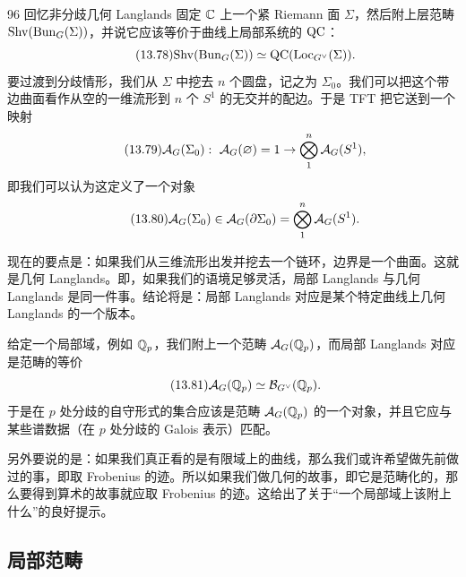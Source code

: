 \begin{srcrem}{96}
回忆非分歧几何 Langlands 固定 $\mathbb{C}$ 上一个紧 Riemann 面 $\Sigma$，然后附上层范畴 $\mathrm{Shv}(\mathrm{Bun}_G(\Sigma))$，并说它应该等价于曲线上局部系统的 $\mathrm{QC}$：
\begin{equation}\tag{13.78}
\mathrm{Shv}(\mathrm{Bun}_G(\Sigma))\simeq\mathrm{QC}(\mathrm{Loc}_{G^\vee}(\Sigma)).
\end{equation}
要过渡到分歧情形，我们从 $\Sigma$ 中挖去 $n$ 个圆盘，记之为 $\Sigma_0$。我们可以把这个带边曲面看作从空的一维流形到 $n$ 个 $S^1$ 的无交并的配边。于是 TFT 把它送到一个映射
\begin{equation}\tag{13.79}
\cA_G(\Sigma_0):\ \cA_G(\varnothing)=1\to\bigotimes_{1}^{n}\cA_G(S^1),
\end{equation}
即我们可以认为这定义了一个对象
\begin{equation}\tag{13.80}
\mathcal{A}_G(\Sigma_0)\in\mathcal{A}_G(\partial\Sigma_0)=\bigotimes_{1}^{n}\mathcal{A}_G(S^1).
\end{equation}
\end{srcrem}

现在的要点是：如果我们从三维流形出发并挖去一个链环，边界是一个曲面。这就是几何 Langlands。即，如果我们的语境足够灵活，局部 Langlands 与几何 Langlands 是同一件事。结论将是：局部 Langlands 对应是某个特定曲线上几何 Langlands 的一个版本。

给定一个局部域，例如 $\mathbb{Q}_p$，我们附上一个范畴 $\mathcal{A}_G(\mathbb{Q}_p)$，而局部 Langlands 对应是范畴的等价
\begin{equation}\tag{13.81}
\mathcal{A}_G(\mathbb{Q}_p)\simeq\mathcal{B}_{G^\vee}(\mathbb{Q}_p).
\end{equation}
于是在 $p$ 处分歧的自守形式的集合应该是范畴 $\mathcal{A}_G(\mathbb{Q}_p)$ 的一个对象，并且它应与某些谱数据（在 $p$ 处分歧的 Galois 表示）匹配。

另外要说的是：如果我们真正看的是有限域上的曲线，那么我们或许希望做先前做过的事，即取 Frobenius 的迹。所以如果我们做几何的故事，即它是范畴化的，那么要得到算术的故事就应取 Frobenius 的迹。这给出了关于“一个局部域上该附上什么”的良好提示。

\subsection{局部范畴}\label{sec:13-6-2}

